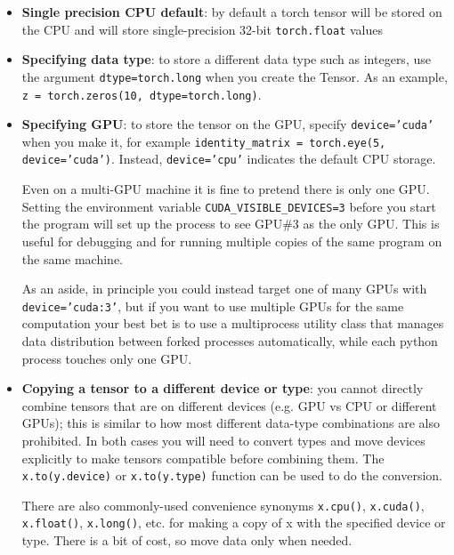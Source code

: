 \begin{itemize}
    \item \textbf{Single precision CPU default}: by default a torch tensor will be stored on the CPU and will store single-precision 32-bit \texttt{torch.float} values 
    \item \textbf{Specifying data type}: to store a different data type such as integers, use the argument \texttt{dtype=torch.long} when you create the Tensor. As an example, \texttt{z = torch.zeros(10, dtype=torch.long)}. 
    \item \textbf{Specifying GPU}: to store the tensor on the GPU, specify \texttt{device='cuda'} when you make it, for example \texttt{identity\_matrix = torch.eye(5, device='cuda')}. Instead, \texttt{device='cpu'} indicates the default CPU storage.
    
    Even on a multi-GPU machine it is fine to pretend there is only one GPU. Setting the environment variable \texttt{CUDA\_VISIBLE\_DEVICES=3} before you start the program will set up the process to see GPU\#3 as the only GPU.  This is useful for debugging and for running multiple copies of the same program on the same machine.

    As an aside, in principle you could instead target one of many GPUs with \texttt{device='cuda:3'}, but if you want to use multiple GPUs for the same computation your best bet is to use a multiprocess utility class that manages data distribution between forked processes automatically, while each python process touches only one GPU.

    \item \textbf{Copying a tensor to a different device or type}: you cannot directly combine tensors that are on different devices (e.g. GPU vs CPU or different GPUs); this is similar to how most different data-type combinations are also prohibited. In both cases you will need to convert types and move devices explicitly to make tensors compatible before combining them. The \texttt{x.to(y.device)} or \texttt{x.to(y.type)} function can be used to do the conversion. 
    
    There are also commonly-used convenience synonyms \texttt{x.cpu()}, \texttt{x.cuda()}, \texttt{x.float()}, \texttt{x.long()}, etc. for making a copy of x with the specified device or type. There is a bit of cost, so move data only when needed. 


\end{itemize}
